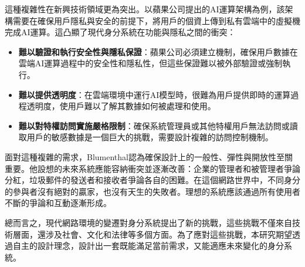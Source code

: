 這種複雜性在新興技術領域更為突出。以蘋果公司提出的AI運算架構\cite{apple_foundation_models}為例，該架構需要在確保用戶隱私與安全的前提下，將用戶的個資上傳到私有雲端\cite{apple_private_cloud_compute}中的虛擬機完成AI運算。這凸顯了現代身分系統在功能與隱私之間的衝突：
\begin{itemize}
  \item \textbf{難以驗證和執行安全性與隱私保證}：蘋果公司必須建立機制，確保用戶數據在雲端AI運算過程中的安全性和隱私性，但這些保證難以被外部驗證或強制執行。
  \item \textbf{難以提供透明度}：在雲端環境中運行AI模型時，很難為用戶提供即時的運算過程透明度，使用戶難以了解其數據如何被處理和使用。
  \item \textbf{難以對特權訪問實施嚴格限制}：確保系統管理員或其他特權用戶無法訪問或讀取用戶的敏感數據是一個巨大的挑戰，需要設計複雜的訪問控制機制。
\end{itemize}

面對這種複雜的需求，Blumenthal\cite{Blumenthal2001RethinkingThe}認為確保設計上的一般性、彈性與開放性至關重要。他設想的未來系統應能容納衝突並逐漸改善：企業的管理者和被管理者爭論分紅，垃圾郵件的發送者和接收者爭論各自的困難。在這個網路世界中，不同身分的參與者沒有絕對的贏家，也沒有天生的失敗者。理想的系統應該通過所有使用者不斷的爭論和互動逐漸形成。

總而言之，現代網路環境的變遷對身分系統提出了新的挑戰，這些挑戰不僅來自技術層面，還涉及社會、文化和法律等多個方面。為了應對這些挑戰，本研究期望透過自主的設計理念，設計出一套既能滿足當前需求，又能適應未來變化的身分系統。
